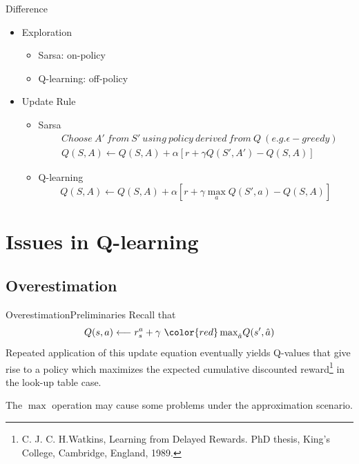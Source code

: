 \documentclass{beamer}
\newcommand{\red}[1]{{\color{red} #1}}
\newcommand{\blue}[1]{{\color{blue} #1}}
\newcommand{\ha}{\hat{a}}
\begin{document}
\begin{frame}{Difference}
  \begin{itemize}
  	\item Exploration
  		\begin{itemize}
  			\item Sarsa: on-policy
  			\item Q-learning: off-policy
  		\end{itemize}
  	\item Update Rule
	  	\begin{itemize}
	  		\item Sarsa
	  		\begin{equation}\nonumber
	  		\begin{aligned}
	  		& Choose~ A'~ from~ S'~ using~policy~derived~from~Q~(e.g. \epsilon-greedy) \\
	  		& Q(S,A) \leftarrow Q(S,A) + \alpha[r + \gamma Q(S', A') - Q(S,A)]
	  		\end{aligned}
	  		\end{equation}
	  		\item Q-learning
	  		\begin{equation}\nonumber
	  		Q(S,A) \leftarrow Q(S,A) + \alpha[r + \gamma \max_a Q(S', a) - Q(S,A)]
	  		\end{equation}
	  	\end{itemize}
  \end{itemize}
\end{frame}




\section{Issues in Q-learning}

\subsection{Overestimation}
\begin{frame}{Overestimation}{Preliminaries}
	Recall that
	\begin{equation}
		Q(s,a) \longleftarrow r^a_s + \gamma~\red{\max}_{\ha} Q(s', \ha)
	\end{equation}
	Repeated application of this update equation eventually yields Q-values that give rise to \blue{a policy which maximizes the expected cumulative discounted reward}\footnote{C. J. C. H.Watkins, Learning from Delayed Rewards. PhD thesis, King’s College, Cambridge, England, 1989.} in the look-up table case.
	
	The \red{$\max$} operation may cause some problems under the approximation scenario.
\end{frame}
\end{document}
